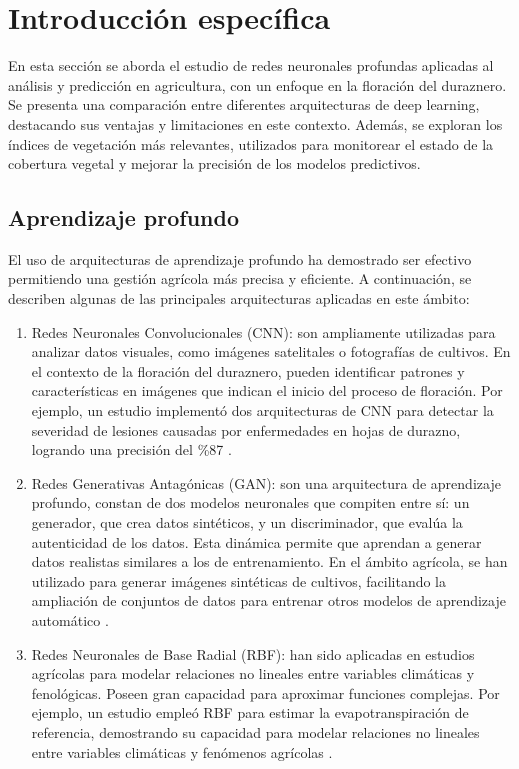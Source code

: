 \chapter{Introducción específica} %

\label{Chapter2}

En esta sección se aborda el estudio de redes neuronales profundas aplicadas al análisis y predicción en 
agricultura, con un enfoque en la floración del duraznero. Se presenta una comparación entre diferentes 
arquitecturas de deep learning, destacando sus ventajas y limitaciones en este contexto. Además, se 
exploran los índices de vegetación más relevantes, utilizados para monitorear el estado de la cobertura 
vegetal y mejorar la precisión de los modelos predictivos.

\section{Aprendizaje profundo}

El uso de arquitecturas de aprendizaje profundo ha demostrado ser efectivo permitiendo 
una gestión agrícola más precisa y eficiente. A continuación, se describen algunas de las principales
arquitecturas aplicadas en este ámbito:


\begin{enumerate}
	\item Redes Neuronales Convolucionales (CNN): son ampliamente utilizadas para analizar datos 
	visuales, como imágenes satelitales o fotografías de cultivos. En el contexto de la floración del duraznero,
	pueden identificar patrones y características en imágenes que indican el inicio del proceso de
	floración. Por ejemplo, un estudio implementó dos arquitecturas de CNN para detectar la severidad de 
	lesiones causadas por enfermedades en hojas de durazno, logrando una precisión del \%87 \citep{Rodriguez2023}. 
	\item Redes Generativas Antagónicas (GAN): son una arquitectura de aprendizaje 
	profundo, constan de dos modelos neuronales que compiten entre sí: un generador, que crea datos sintéticos, y un 
	discriminador, que evalúa la autenticidad de los datos. Esta dinámica permite que aprendan a generar datos 
	realistas similares a los de entrenamiento. En el ámbito agrícola, se han utilizado para generar imágenes 
	sintéticas de cultivos, facilitando la ampliación de conjuntos de datos para entrenar otros modelos de aprendizaje 
	automático \citep{Goodfellow2014}.
	\item Redes Neuronales de Base Radial (RBF): han sido aplicadas en estudios agrícolas para modelar relaciones
	 no lineales entre variables climáticas y fenológicas. Poseen gran capacidad para aproximar funciones complejas.
	 Por ejemplo, un estudio empleó RBF para estimar la evapotranspiración de referencia, demostrando su capacidad
	para modelar relaciones no lineales entre variables climáticas y fenómenos agrícolas \citep{Cerv2012}.
\end{enumerate}
	

